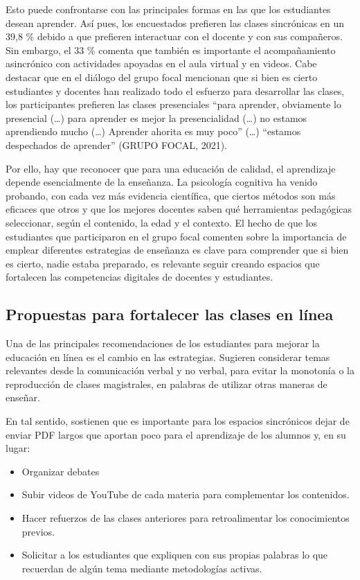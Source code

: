 \documentclass[spanish]{textolivre}
\begin{document}
Esto puede confrontarse con las principales formas en las que los estudiantes desean aprender. Así pues, los encuestados prefieren las clases sincrónicas en un 39,8 \% debido a que prefieren interactuar con el docente y con sus compañeros. Sin embargo, el 33 \% comenta que también es importante el acompañamiento asincrónico con actividades apoyadas en el aula virtual y en videos. Cabe destacar que en el diálogo del grupo focal mencionan que si bien es cierto estudiantes y docentes han realizado todo el esfuerzo para desarrollar las clases, los participantes prefieren las clases presenciales “para aprender, obviamente lo presencial (…) para aprender es mejor la presencialidad (…) no estamos aprendiendo mucho (…) Aprender ahorita es muy poco” (…) “estamos despechados de aprender” (GRUPO FOCAL, 2021).

Por ello, hay que reconocer que para una educación de calidad, el aprendizaje depende esencialmente de la enseñanza. La psicología cognitiva ha venido probando, con cada vez más evidencia científica, que ciertos métodos son más eficaces que otros y que los mejores docentes saben qué herramientas pedagógicas seleccionar, según el contenido, la edad y el contexto. El hecho de que los estudiantes que participaron en el grupo focal comenten sobre la importancia de emplear diferentes estrategias de enseñanza es clave para comprender que si bien es cierto, nadie estaba preparado, es relevante seguir creando espacios que fortalecen las competencias digitales de docentes y estudiantes. 

\subsection{Propuestas para fortalecer las clases en línea}\label{sec-modelo}
Una de las principales recomendaciones de los estudiantes para mejorar la educación en línea es el cambio en las estrategias. Sugieren considerar temas relevantes desde la comunicación verbal y no verbal, para evitar la monotonía o la reproducción de clases magistrales, en palabras de \textcite{vinals_blanco_rol_2016} utilizar otras maneras de enseñar.

En tal sentido, sostienen que es importante para los espacios sincrónicos dejar de enviar PDF largos que aportan poco para el aprendizaje de los alumnos y, en su lugar:

\begin{itemize}
    \item Organizar debates
    \item Subir videos de YouTube de cada materia para complementar los contenidos.
    \item  Hacer refuerzos de las clases anteriores para retroalimentar los conocimientos previos. 
    \item Solicitar a los estudiantes que expliquen con sus propias palabras lo que recuerdan de algún tema mediante metodologías activas.
\end{itemize}
\end{document}

